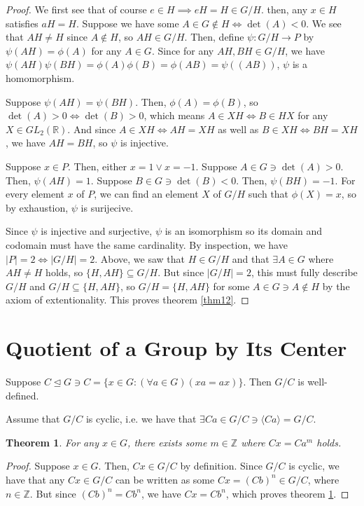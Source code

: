 \documentclass[12pt]{article}
\newcommand{\reals}{\mathbb{R}}
\newcommand{\ints}{\mathbb{Z}}
\newcommand{\gltwo}{GL_2(\reals)}
\newtheorem{thm}{Theorem}
\begin{document}
\begin{proof}
We first see that of course $e \in H \implies eH = H \in G/H$.
then, any $x \in H$ satisfies $aH = H$.
Suppose we have some $A \in G \not\in H \iff \det(A) < 0$.
We see that $AH \neq H$ since $A \not\in H$, so $AH \in G/H$.
Then, define $\psi:G/H \to P$ by $\psi(AH) = \phi(A)$ for any $A \in G$.
Since for any $AH, BH \in G/H$,
we have $\psi(AH)\psi(BH) = \phi(A)\phi(B) = \phi(AB) = \psi((AB))$,
$\psi$ is a homomorphism.

Suppose $\psi(AH) = \psi(BH)$.
Then, $\phi(A) = \phi(B)$,
so $\det(A) > 0 \iff \det(B) > 0$,
which means $A \in XH \iff B \in HX$
for any $X \in \gltwo$.
And since $A \in XH \iff AH = XH$
as well as $B \in XH \iff BH = XH$,
we have $AH = BH$,
so $\psi$ is injective.

Suppose $x \in P$.
Then, either $x = 1 \lor x = -1$.
Suppose $A \in G \ni \det(A) > 0$.
Then, $\psi(AH) = 1$.
Suppose $B \in G \ni \det(B) < 0$.
Then, $\psi(BH) = -1$.
For every element $x$ of $P$,
we can find an element $X$ of $G/H$
such that $\phi(X) = x$,
so by exhaustion,
$\psi$ is surijecive.

Since $\psi$ is injective and surjective,
$\psi$ is an isomorphism so its
domain and codomain
must have the same cardinality.
By inspection, we have $|P| = 2 \iff |G/H| = 2$.
Above, we saw that $H \in G/H$
and that $\exists A \in G$
where $AH \neq H$ holds,
so $\{H, AH\} \subseteq G/H$.
But since $|G/H| = 2$,
this must fully describe $G/H$
and $G/H \subseteq \{ H, AH \}$,
so $G/H = \{H, AH\}$
for some $A \in G \ni A \not\in H$
by the axiom of extentionality.
This proves theorem \ref{thm12}.
\end{proof}

\section{Quotient of a Group by Its Center}

Suppose $C \trianglelefteq G \ni C = \{x \in G : (\forall a \in G)(xa = ax) \}$.
Then $G/C$ is well-defined.

Assume that $G/C$ is cyclic, i.e.
we have that $\exists Ca \in G/C \ni \langle Ca \rangle = G/C$.

\begin{thm} \label{thm13}
	For any $x \in G$, there exists some $m \in \ints$ where $Cx = Ca^m$ holds.
\end{thm}

\begin{proof}
	Suppose $x \in G$.
	Then, $Cx \in G/C$ by definition.
	Since $G/C$ is cyclic,
	we have that any $Cx \in G/C$
	can be written as some $Cx = (Cb)^n \in G/C$,
	where $n \in \ints$.
	But since $(Cb)^n = Cb^n$,
	we have $Cx = Cb^n$,
	which proves theorem \ref{thm13}.
\end{proof}
\end{document}
